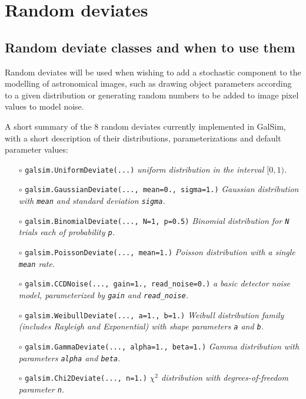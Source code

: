 \documentclass[preprint,11pt]{aastex}
\begin{document}
\section{Random deviates}\label{sect:random}
\subsection{Random deviate classes and when to use them}
Random deviates will be used when wishing to add a stochastic
component to the modelling of astronomical images, such as drawing
object parameters according to a given distribution or generating random
numbers to be added to image pixel values to model noise. 

A short summary of the 8 random deviates currently implemented in GalSim,
with a short description of their distributions, parameterizations and
default parameter values:
\begin{itemize}

\item[$\circ$] \texttt{galsim.UniformDeviate(...)} \newline \emph{uniform distribution in the
  interval $[0, 1)$.}

\item[$\circ$] \texttt{galsim.GaussianDeviate(..., mean=0., sigma=1.)} \newline \emph{Gaussian distribution
with \texttt{mean} and standard deviation \texttt{sigma}.}

\item[$\circ$] \texttt{galsim.BinomialDeviate(..., N=1, p=0.5)} \newline \emph{Binomial
    distribution for \texttt{N} trials each of probability \texttt{p}.}

\item[$\circ$] \texttt{galsim.PoissonDeviate(..., mean=1.)} \newline \emph{Poisson distribution
    with a single \texttt{mean} rate.}

\item[$\circ$] \texttt{galsim.CCDNoise(..., gain=1., read\_noise=0.)}  \newline \emph{a
    basic detector noise model, parameterized by \texttt{gain} and \texttt{read\_noise}.}

\item[$\circ$] \texttt{galsim.WeibullDeviate(..., a=1., b=1.)} \newline \emph{Weibull distribution
    family (includes Rayleigh and Exponential) with shape parameters \texttt{a} and \texttt{b}.}

\item[$\circ$] \texttt{galsim.GammaDeviate(..., alpha=1., beta=1.)} \newline \emph{Gamma distribution with
    parameters \texttt{alpha} and \texttt{beta}.}

\item[$\circ$] \texttt{galsim.Chi2Deviate(..., n=1.)} \newline \emph{$\chi^2$ distribution
    with degrees-of-freedom parameter \texttt{n}.}

\end{itemize}
\end{document}
